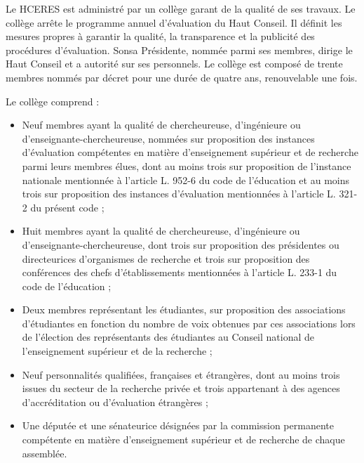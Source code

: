 \bigskip

Le HCERES est administr\'e par un coll\`ege garant de la qualit\'e de ses travaux. Le coll\`ege arr\^ete le programme annuel d'\'evaluation du Haut Conseil. Il d\'efinit les mesures propres \`a garantir la qualit\'e, la transparence et la publicit\'e des proc\'edures d'\'evaluation. Son\mp sa Pr\'esident\mp e, nomm\'e\mp e parmi ses membres, dirige le Haut Conseil et a autorit\'e sur ses personnels. Le coll\`ege est compos\'e de trente membres nomm\'es par d\'ecret pour une dur\'ee de quatre ans, renouvelable une fois.

Le coll\`ege comprend :
\begin{itemize}
\item Neuf membres ayant la qualit\'e de chercheur\mp euse, d'ing\'enieur\mp e ou d'enseignant\mp e-chercheur\mp euse, nomm\'e\mp e\mp s sur proposition des instances d'\'evaluation comp\'etentes en mati\`ere d'enseignement sup\'erieur et de recherche parmi leurs membres \'elu\mp e\mp s, dont au moins trois sur proposition de l'instance nationale mentionn\'ee 
\`a l'article L. 952-6 du code de l'\'education et au moins trois sur proposition des instances d'\'evaluation mentionn\'ees \`a l'article L. 321-2 du pr\'esent code ;
\item Huit membres ayant la qualit\'e de chercheur\mp euse, d'ing\'enieur\mp e ou d'enseignant\mp e-chercheur\mp euse, dont trois sur proposition des pr\'esident\mp e\mp s ou directeur\mp ices d'organismes de recherche et trois sur proposition des conf\'erences des chefs d'\'etablissements mentionn\'ees \`a l'article L. 233-1 du code de l'\'education ;
\item Deux membres repr\'esentant les \'etudiant\mp e\mp s, sur proposition des associations d'\'etudiant\mp e\mp s en fonction du nombre de voix obtenues par ces associations lors de l'\'election des repr\'esentants des \'etudiant\mp e\mp s au Conseil national de l'enseignement sup\'erieur et de la recherche ;
\item Neuf personnalit\'es qualifi\'ees, fran\c caises et \'etrang\`eres, dont au moins trois issues du secteur de la recherche priv\'ee et trois appartenant \`a des agences d'accr\'editation ou d'\'evaluation \'etrang\`eres ;
\item Un\mp e d\'eput\'e\mp e et un\mp e s\'enateur\mp ice d\'esign\'e\mp e\mp s par la commission permanente comp\'etente en mati\`ere d'enseignement sup\'erieur et de recherche de chaque assembl\'ee.
\end{itemize}
 
